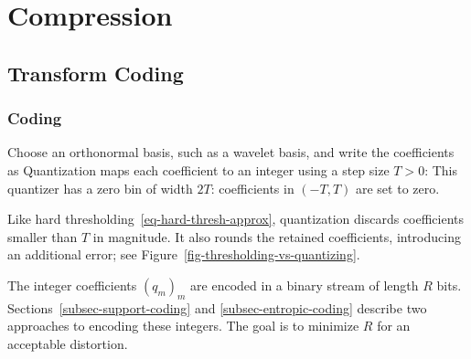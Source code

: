 
\chapter{Compression}


\section{Transform Coding}
\label{sec-transform-coding}

\subsection{Coding}

Choose an orthonormal basis, such as a wavelet basis, and write the coefficients as
Quantization maps each coefficient to an integer using a step size $T>0$:
This quantizer has a zero bin of width $2T$: coefficients in $(-T,T)$ are set to zero.

Like hard thresholding~\eqref{eq-hard-thresh-approx}, quantization discards coefficients smaller than $T$ in magnitude. It also rounds the retained coefficients, introducing an additional error; see Figure~\ref{fig-thresholding-vs-quantizing}.


The integer coefficients $(q_m)_m$ are encoded in a binary stream of length $R$ bits.
Sections~\ref{subsec-support-coding} and \ref{subsec-entropic-coding} describe two approaches to encoding these integers. The goal is to minimize $R$ for an acceptable distortion.

